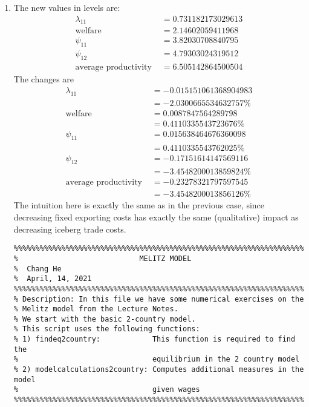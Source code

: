 \begin{enumerate}
\item
  The new values in levels are: 
  \begin{align*}
    \lambda_{11} &= 0.731182173029613 \\
    \text{welfare } &= 2.14602059411968\\
    \psi_{11} &= 3.82030708840795\\
    \psi_{12} &= 4.79303024319512 \\
    \text{average productivity }&= 6.505142864500504 
  \end{align*}
  The changes are
  \begin{align*}
    \lambda_{11} &= - 0.015151061368904983\\
                 &= - 2.0300665534632757 \% \\
    \text{welfare } &= 0.0087847564289798 \\
                 &= 0.4110335543723676 \% \\
    \psi_{11} &= 0.015638464676360098 \\
                 &= 0.4110335543762025 \% \\
    \psi_{12} &= -0.17151614147569116 \\
                 &= -3.4548200013859824 \% \\
    \text{average productivity } &= - 0.23278321797597545 \\
    &= - 3.4548200013856126 \%
  \end{align*}
  The intuition here is exactly the same as in the previous case, since decreasing fixed exporting costs has exactly the same (qualitative) impact as decreasing iceberg trade costs.
  \begin{verbatim}
%%%%%%%%%%%%%%%%%%%%%%%%%%%%%%%%%%%%%%%%%%%%%%%%%%%%%%%%%%%%%%%%%%%%%%%%%%%%%%%%%%%%%%%%%%%%%%%%%%%%%%%%%%%%%%%%%%%%%%%%%%%%%%%%%%%%%%%%%%%%%%%%%%%%
%                            MELITZ MODEL
%  Chang He
%  April, 14, 2021
%%%%%%%%%%%%%%%%%%%%%%%%%%%%%%%%%%%%%%%%%%%%%%%%%%%%%%%%%%%%%%%%%%%%%%%%%%%%%%%%%%%%%%%%%%%%%%%%%%%%%%%%%%%%%%%%%%%%%%%%%%%%%%%%%%%%%%%%%%%%%%%%%%%%
% Description: In this file we have some numerical exercises on the
% Melitz model from the Lecture Notes. 
% We start with the basic 2-country model. 
% This script uses the following functions:
% 1) findeq2country:            This function is required to find the 
%                               equilibrium in the 2 country model
% 2) modelcalculations2country: Computes additional measures in the model
%                               given wages
%%%%%%%%%%%%%%%%%%%%%%%%%%%%%%%%%%%%%%%%%%%%%%%%%%%%%%%%%%%%%%%%%%%%%%%%%%%%%%%%%%%%%%%%%%%%%%%%%%%%%%%%%%%%%%%%%%%%%%%%%%%%%%%

\end{verbatim}
\end{enumerate}
